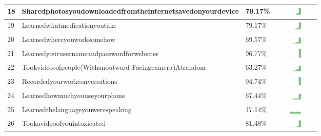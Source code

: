 \begin{table}[t]
\begin{center}
\begin{tabular}{| p{0.5cm} | p{7cm} | p{1cm} | c |}
18 & Sharedphotosyoudownloadedfromtheinternetsavedonyourdevice & 79.17\% & \includegraphics[width = 2cm, height = 0.5cm]{../sharedphotosyoudownloadedfromtheinternetsavedonyourdeviceFRIENDS} \\ \hline 
19 & Learnedwhatmedicationyoutake & 79.17\% & \includegraphics[width = 2cm, height = 0.5cm]{../learnedwhatmedicationyoutakeFRIENDS} \\ \hline 
20 & Learnedwhereyouworksomehow & 69.57\% & \includegraphics[width = 2cm, height = 0.5cm]{../learnedwhereyouworksomehowFRIENDS} \\ \hline 
21 & Learnedyourusernameandpasswordforwebsites & 96.77\% & \includegraphics[width = 2cm, height = 0.5cm]{../learnedyourusernameandpasswordforwebsitesFRIENDS} \\ \hline 
22 & Tookvideosofpeople(Withanoutward-Facingcamera)Atrandom & 63.27\% & \includegraphics[width = 2cm, height = 0.5cm]{../tookvideosofpeople(withanoutward-facingcamera)atrandomFRIENDS} \\ \hline 
23 & Recordedyourworkconversations & 94.74\% & \includegraphics[width = 2cm, height = 0.5cm]{../recordedyourworkconversationsFRIENDS} \\ \hline 
24 & Learnedhowmuchyouuseyourphone & 67.44\% & \includegraphics[width = 2cm, height = 0.5cm]{../learnedhowmuchyouuseyourphoneFRIENDS} \\ \hline 
25 & Learnedthelanguageyouwerespeaking & 17.14\% & \includegraphics[width = 2cm, height = 0.5cm]{../learnedthelanguageyouwerespeakingFRIENDS} \\ \hline 
26 & Tookavideoofyouintoxicated & 81.48\% & \includegraphics[width = 2cm, height = 0.5cm]{../tookavideoofyouintoxicatedFRIENDS} \\ \hline 

\end{tabular}
\end{center}
\end{table}
